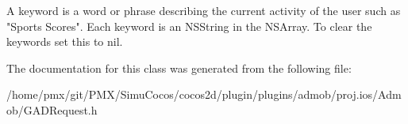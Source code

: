 A keyword is a word or phrase describing the current activity of the user such as "Sports Scores". Each keyword is an N\+S\+String in the N\+S\+Array. To clear the keywords set this to nil. 

The documentation for this class was generated from the following file\+:\begin{DoxyCompactItemize}
\item 
/home/pmx/git/\+P\+M\+X/\+Simu\+Cocos/cocos2d/plugin/plugins/admob/proj.\+ios/\+Admob/G\+A\+D\+Request.\+h\end{DoxyCompactItemize}
